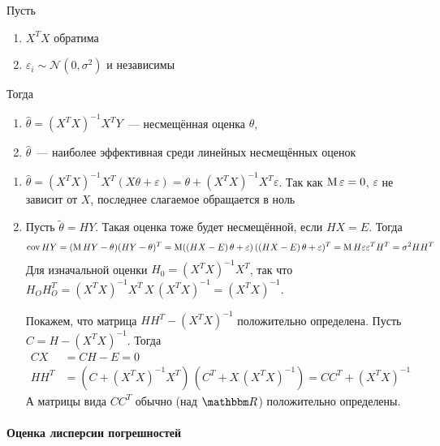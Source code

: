 \documentclass[12pt,timbord]{../../../notes}
\begin{document}
\begin{thrm}\label{thrm:stat::guasmark}
  Пусть 
  \begin{enumerate}
    \item $X^TX$ обратима
    \item $\varepsilon_i \sim \mathcal N(0,\sigma^2)$ и независимы
  \end{enumerate}
  Тогда 
  \begin{enumerate}
    \item $\hat \theta = (X^T X)^{-1} X^T Y$~--- несмещённая оценка $\theta$,
    \item $\hat\theta$~--- наиболее эффективная среди линейных несмещённых оценок
  \end{enumerate}
\end{thrm}
\begin{ittproof}
  \begin{enumerate}
    \item $\hat \theta = (X^TX)^{-1} X^T (X\theta + \varepsilon) = \theta + (X^TX)^{-1} X^T
      \varepsilon $. Так как $\operatorname{M} \varepsilon = 0$, $\varepsilon$ не зависит от $X$, последнее
      слагаемое обращается в ноль
    \item Пусть $\widetilde{\theta} = HY$. Такая оценка тоже будет несмещённой, если $HX = E$.
      Тогда\[
        \operatorname{cov} HY = (\operatorname{M} HY - \theta ) (HY - \theta )^T 
        = \operatorname{M} ( (HX-E)\, \theta + \varepsilon)\,( (HX-E)\, \theta + \varepsilon)^T
        = \operatorname{M} H \varepsilon \varepsilon^T H^T = \sigma^2 HH^T
      \]
      Для изначальной оценки $H_0 = (X^T X)^{-1}X^T$, так что 
      $H_OH_O^T =(X^T X)^{-1}X^T \, X \, (X^T X)^{-1} = (X^TX)^{-1}$.

      Покажем, что матрица $HH^T - (X^T X)^{-1} $ положительно определена. Пусть 
      $C = H - (X^T X)^{-1}$. Тогда 
      \begin{align*}
        CX &= CH - E = 0\\
        HH^T &= (C + (X^T X)^{-1} X^T)\, (C^T + X\,(X^T X)^{-1}) = CC^T + (X^TX)^{-1}
      \end{align*}
      А матрицы вида $CC^T$ обычно (над $\R$) положительно определены.
  \end{enumerate}
\end{ittproof}

\paragraph{Оценка лисперсии погрешностей}
\label{par:stat::estdispLSM}
\end{document}
